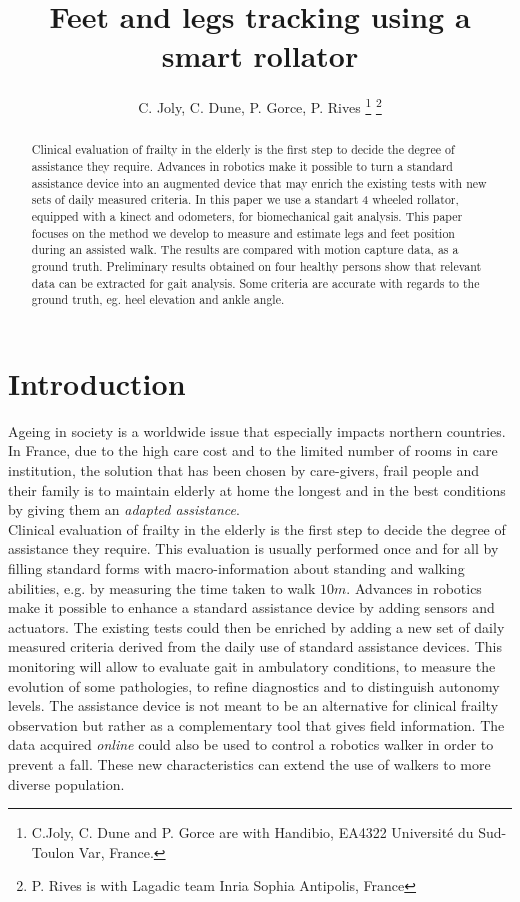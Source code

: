 \documentclass[letterpaper, 10 pt, conference]{ieeeconf}
\title{\LARGE \bf Feet and legs tracking using a smart rollator
 }
\author{
C. Joly, C. Dune,  P. Gorce, P. Rives
\thanks{C.Joly, C. Dune and P. Gorce are with
Handibio, EA4322 Université du Sud- Toulon Var, France. 
}
\thanks{P. Rives is
 with Lagadic team Inria Sophia Antipolis, France}
}
\begin{document}
\maketitle
\thispagestyle{empty}
\pagestyle{empty}


\begin{abstract}
Clinical evaluation of frailty in the elderly is the first step to decide the degree of assistance they require. Advances in robotics make it possible to turn a standard assistance device into an augmented device that may enrich the existing tests with new sets of daily measured criteria. In this paper we use a standart 4 wheeled rollator, equipped with a kinect and odometers, for biomechanical gait analysis. This paper focuses on the method we develop to measure and estimate legs and feet position during an assisted walk. The results are compared with motion capture data, as a ground truth. Preliminary results obtained on four healthy persons show that relevant data can be extracted for gait analysis. Some criteria are accurate with regards to the ground truth, eg. heel elevation and ankle angle.
\end{abstract}

\section{Introduction}

 Ageing in society is a worldwide issue that especially impacts northern countries. In France, due to the high care cost and to the limited number of rooms in care institution, the solution that has been chosen by care-givers, frail people and their family is to maintain elderly at home the longest and in the best conditions by giving them an\textit{ adapted assistance}.  \\

Clinical evaluation of frailty in the elderly is the first step to decide the degree of assistance they require. This evaluation is usually performed once and for all by filling standard forms with macro-information about standing and walking abilities, e.g. by measuring the time taken to walk $10m$. Advances in robotics make it possible to enhance a standard assistance device by adding sensors and actuators. The existing tests could  then be enriched by adding a new set of daily measured criteria derived from the daily use of standard assistance devices. This monitoring will allow to evaluate gait in ambulatory conditions, to measure the evolution of some pathologies, to refine diagnostics and to distinguish autonomy levels. The assistance device is not meant to be an alternative for clinical frailty observation but rather as a complementary tool that gives field information. The data acquired \textit{online} could also be used to control a robotics walker in order to prevent a fall. These new characteristics can extend the use of walkers to more diverse population. \\ 
\end{document}
